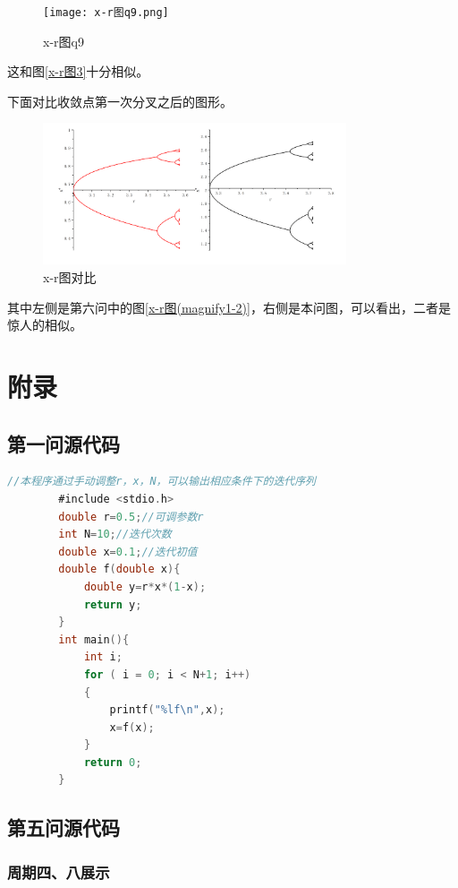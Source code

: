\documentclass[10pt, a4paper]{article}
\begin{document}
    \begin{figure}[H]
        \centering
        \texttt{[image: x-r图q9.png]}
        \caption{x-r图q9}
        \label{x-r图q9}
    \end{figure}

    这和图\ref{x-r图3}十分相似。

    下面对比收敛点第一次分叉之后的图形。

    \begin{figure}[H]
        \centering
        \includegraphics[width=0.8\textwidth]{x-r图对比.jpg}
        \caption{x-r图对比}
        \label{x-r图对比}
    \end{figure}

    其中左侧是第六问中的图\ref{x-r图(magnify1-2)}，右侧是本问图，可以看出，二者是惊人的相似。

    \section{附录}
    \subsection{第一问源代码}
    \begin{lstlisting}[language=C]
        //本程序通过手动调整r，x，N，可以输出相应条件下的迭代序列
        #include <stdio.h>
        double r=0.5;//可调参数r
        int N=10;//迭代次数
        double x=0.1;//迭代初值
        double f(double x){
            double y=r*x*(1-x);
            return y;
        }
        int main(){
            int i;
            for ( i = 0; i < N+1; i++)
            {
                printf("%lf\n",x);
                x=f(x);
            }
            return 0;    
        }
        \end{lstlisting}

    \subsection{第五问源代码}
    \subsubsection{周期四、八展示}
\end{document}
